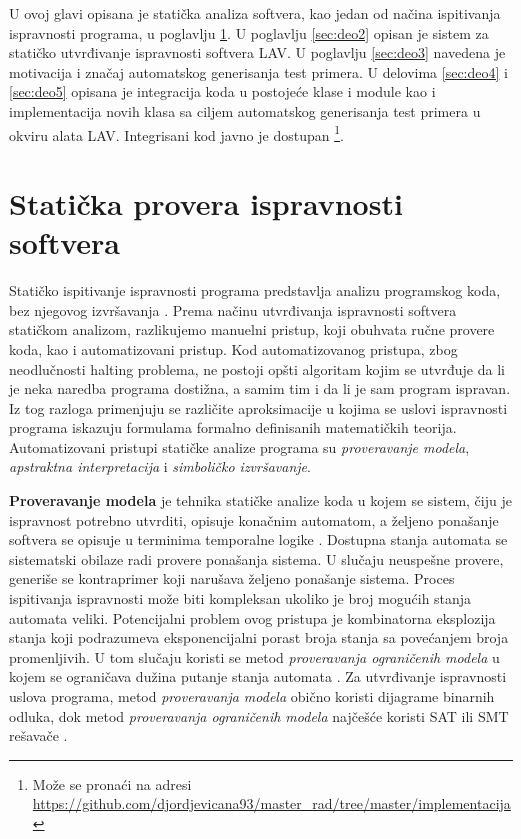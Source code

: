 \documentclass[12pt,oneside]{memoir}
\begin{document}
U ovoj glavi opisana je statička analiza softvera, kao jedan od načina ispitivanja ispravnosti programa, u poglavlju \ref{sec:deo1}. U poglavlju \ref{sec:deo2} opisan je sistem za statičko utvrđivanje ispravnosti softvera LAV. U poglavlju \ref{sec:deo3} navedena je motivacija i značaj automatskog generisanja test primera. U delovima \ref{sec:deo4} i \ref{sec:deo5} opisana je integracija koda u postojeće klase i module kao i implementacija novih klasa sa ciljem automatskog generisanja test primera u okviru alata LAV. Integrisani kod javno je dostupan \footnote{Može se pronaći na adresi \url{https://github.com/djordjevicana93/master_rad/tree/master/implementacija}}.


\section{Statička provera ispravnosti softvera} \label{sec:deo1}
Statičko ispitivanje ispravnosti programa predstavlja analizu programskog koda, bez njegovog izvršavanja \cite{StaticVerification}. Prema načinu utvrđivanja ispravnosti softvera statičkom analizom, razlikujemo manuelni pristup, koji obuhvata ručne provere koda, kao i automatizovani pristup. Kod automatizovanog pristupa, zbog neodlučnosti halting problema, ne postoji opšti algoritam kojim se utvrđuje da li je neka naredba programa dostižna, a samim tim i da li je sam program ispravan. Iz tog razloga primenjuju se različite aproksimacije u kojima se uslovi ispravnosti programa iskazuju formulama formalno definisanih matematičkih teorija. Automatizovani pristupi statičke analize programa su \textit{proveravanje modela}, \textit{apstraktna interpretacija} i \textit{simboličko izvršavanje}.
\par
\textbf{Proveravanje modela} je tehnika statičke analize koda u kojem se sistem, čiju je ispravnost potrebno utvrditi, opisuje konačnim automatom, a željeno ponašanje softvera se opisuje u terminima temporalne logike \cite{TemporalLogic}. Dostupna stanja automata se sistematski obilaze radi provere ponašanja sistema. U slučaju neuspešne provere, generiše se kontraprimer koji narušava željeno ponašanje sistema. Proces ispitivanja ispravnosti može biti kompleksan ukoliko je broj mogućih stanja automata veliki. Potencijalni problem ovog pristupa je kombinatorna eksplozija stanja koji podrazumeva eksponencijalni porast broja stanja sa povećanjem broja promenljivih.
U tom slučaju koristi se metod \textit{proveravanja ograničenih modela} u kojem se ograničava dužina putanje stanja automata \cite{Verification}. Za utvrđivanje ispravnosti uslova programa, metod \textit{proveravanja modela} obično koristi dijagrame binarnih odluka, dok metod \textit{proveravanja ograničenih modela} najčešće koristi SAT ili SMT rešavače \cite{ModelCheck}.
\end{document}
